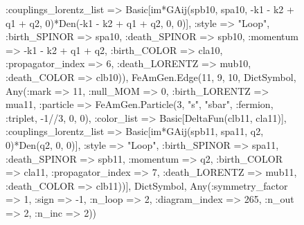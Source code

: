 \documentclass{revtex4}
\begin{document}
\begin{figure}[!htb]
\begin{center}
{:couplings_lorentz_list => Basic[im*GAij(spb10, spa10, -k1 - k2 + q1 + q2, 0)*Den(-k1 - k2 + q1 + q2, 0, 0)], :style => "Loop", :birth_SPINOR => spa10, :death_SPINOR => spb10, :momentum => -k1 - k2 + q1 + q2, :birth_COLOR => cla10, :propagator_index => 6, :death_LORENTZ => mub10, :death_COLOR => clb10)), FeAmGen.Edge(11, 9, 10, Dict{Symbol, Any}(:mark => 11, :null_MOM => 0, :birth_LORENTZ => mua11, :particle => FeAmGen.Particle(3, "s", "sbar", :fermion, :triplet, -1//3, 0, 0), :color_list => Basic[DeltaFun(clb11, cla11)], :couplings_lorentz_list => Basic[im*GAij(spb11, spa11, q2, 0)*Den(q2, 0, 0)], :style => "Loop", :birth_SPINOR => spa11, :death_SPINOR => spb11, :momentum => q2, :birth_COLOR => cla11, :propagator_index => 7, :death_LORENTZ => mub11, :death_COLOR => clb11))], Dict{Symbol, Any}(:symmetry_factor => 1, :sign => -1, :n_loop => 2, :diagram_index => 265, :n_out => 2, :n_inc => 2)) 
}
\end{center}
\end{figure}
\end{document}
